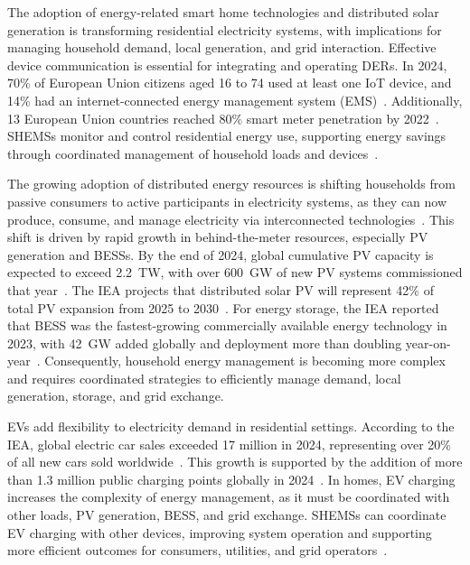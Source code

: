 \documentclass[preprint,12pt, 3p]{elsarticle}
\begin{document}
The adoption of energy-related smart home technologies and distributed solar generation is transforming residential electricity systems, with implications for managing household demand, local generation, and grid interaction. Effective device communication is essential for integrating and operating \glspl{DER}. In 2024, 70\% of European Union citizens aged 16 to 74 used at least one \gls{IoT} device, and 14\% had an internet-connected energy management system (EMS)~\cite{eurostat_iot_individuals_2025}. Additionally, 13 European Union countries reached 80\% smart meter penetration by 2022~\cite{ec_smart_grids_meters_2026}. \Glspl{SHEMS} monitor and control residential energy use, supporting energy savings through coordinated management of household loads and devices~\cite{hendron2021modeling}.

The growing adoption of distributed energy resources is shifting households from passive consumers to active participants in electricity systems, as they can now produce, consume, and manage electricity via interconnected technologies~\cite{iea_unlocking_der_2022,nrel_demand_side_opportunity_2021}. This shift is driven by rapid growth in behind-the-meter resources, especially \gls{PV} generation and \glspl{BESS}. By the end of 2024, global cumulative \gls{PV} capacity is expected to exceed 2.2~TW, with over 600~GW of new \gls{PV} systems commissioned that year~\cite{ieapvps_snapshot_2025}. The \gls{IEA} projects that distributed solar \gls{PV} will represent 42\% of total \gls{PV} expansion from 2025 to 2030~\cite{iea_renewable_progress_tracker}. For energy storage, the \gls{IEA} reported that \gls{BESS} was the fastest-growing commercially available energy technology in 2023, with 42~GW added globally and deployment more than doubling year-on-year~\cite{iea_batteries_secure_transitions_2024}. Consequently, household energy management is becoming more complex and requires coordinated strategies to efficiently manage demand, local generation, storage, and grid exchange.

\Glspl{EV} add flexibility to electricity demand in residential settings. According to the \Gls{IEA}, global electric car sales exceeded 17 million in 2024, representing over 20\% of all new cars sold worldwide~\cite{iea_global_ev_outlook_2025}. This growth is supported by the addition of more than 1.3 million public charging points globally in 2024~\cite{iea_ev_charging_2025}. In homes, \gls{EV} charging increases the complexity of energy management, as it must be coordinated with other loads, \gls{PV} generation, \gls{BESS}, and grid exchange. \Glspl{SHEMS} can coordinate \gls{EV} charging with other devices, improving system operation and supporting more efficient outcomes for consumers, utilities, and grid operators~\cite{nrel_residential_ev_hems_2021}.
\end{document}
